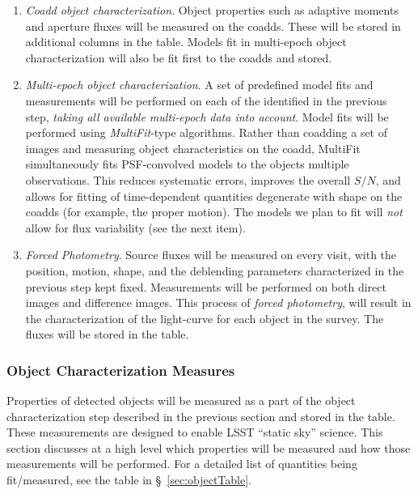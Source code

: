 \documentclass[SE,lsstdraft,toc]{lsstdoc}
\begin{document}
\begin{enumerate}
    The deblender will make use of all information available at this stage, including the knowledge of peak positions, bands, time, time variability (from Prompt products), Galactic longitude and latitude, etc. The output of this stage is a list of uncharacterized \Objects\footnote{Depending on the exact implementation of the deblender, this stage may also attach significant metadata (eg, deblended footprints and pixel-weight maps) to each deblended \Object record.}.
    \item \emph{Coadd object characterization}.  Object properties such as adaptive moments and aperture fluxes will be measured on the coadds.  These will be stored in additional columns in the \Object table.  Models fit in multi-epoch object characterization will also be fit first to the coadds and stored. 
    \item \emph{Multi-epoch object characterization}. A set of predefined model fits and measurements will be performed on each of the \Objects identified in the previous step, \textit{taking all available multi-epoch data into account}. Model fits will be performed using \emph{MultiFit}-type algorithms. Rather than coadding a set of images and measuring object characteristics on the coadd, MultiFit simultaneously fits PSF-convolved models to the objects multiple observations. This reduces systematic errors, improves the overall $S/N$, and allows for fitting of time-dependent quantities degenerate with shape on the coadds (for example, the proper motion). The models we plan to fit will \emph{not} allow for flux variability (see the next item). 
    \item \emph{Forced Photometry}. Source fluxes will be measured on every visit, with the position, motion, shape, and the deblending parameters characterized in the previous step kept fixed.
Measurements will be performed on both direct images and difference images.
This process of \emph{forced photometry}, will result in the characterization of the light-curve for each object in the survey. The fluxes will be stored in the \ForcedSource table.
\end{enumerate}

\subsubsection{Object Characterization Measures}
\label{sec:objchar}

Properties of detected objects will be measured as a part of the object characterization step described in the previous section and stored in the \Object table. These measurements are designed to enable LSST ``static sky'' science. This section discusses at a high level which properties will be measured and how those measurements will be performed. For a detailed list of quantities being fit/measured, see the table in \S~\ref{sec:objectTable}.
\end{document}
